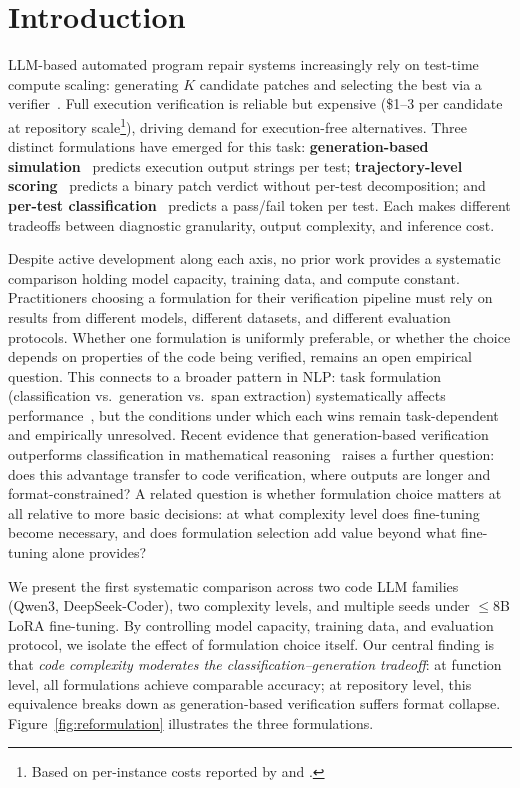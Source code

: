 \section{Introduction}
\label{sec:introduction}

LLM-based automated program repair systems increasingly rely on test-time compute scaling: generating $K$ candidate patches and selecting the best via a verifier~\cite{snell2024scaling}. Full execution verification is reliable but expensive (\$1--3 per candidate at repository scale\footnote{Based on per-instance costs reported by \citet{yang2024sweagent} and \citet{xia2024agentless}.}), driving demand for execution-free alternatives. Three distinct formulations have emerged for this task: \textbf{generation-based simulation}~\cite{meta2025cwm,maimon2026selfexecution} predicts execution output strings per test; \textbf{trajectory-level scoring}~\cite{shum2025swerm} predicts a binary patch verdict without per-test decomposition; and \textbf{per-test classification}~\cite{ni2023lever,chen2023codet} predicts a pass/fail token per test. Each makes different tradeoffs between diagnostic granularity, output complexity, and inference cost.

Despite active development along each axis, no prior work provides a systematic comparison holding model capacity, training data, and compute constant. Practitioners choosing a formulation for their verification pipeline must rely on results from different models, different datasets, and different evaluation protocols. Whether one formulation is uniformly preferable, or whether the choice depends on properties of the code being verified, remains an open empirical question. This connects to a broader pattern in NLP: task formulation (classification vs.\ generation vs.\ span extraction) systematically affects performance~\cite{raffel2020t5}, but the conditions under which each wins remain task-dependent and empirically unresolved. Recent evidence that generation-based verification outperforms classification in mathematical reasoning~\cite{hosseini2025genrm} raises a further question: does this advantage transfer to code verification, where outputs are longer and format-constrained? A related question is whether formulation choice matters at all relative to more basic decisions: at what complexity level does fine-tuning become necessary, and does formulation selection add value beyond what fine-tuning alone provides?

We present the first systematic comparison across two code LLM families (Qwen3, DeepSeek-Coder), two complexity levels, and multiple seeds under ${\leq}$8B LoRA fine-tuning. By controlling model capacity, training data, and evaluation protocol, we isolate the effect of formulation choice itself. Our central finding is that \emph{code complexity moderates the classification--generation tradeoff}: at function level, all formulations achieve comparable accuracy; at repository level, this equivalence breaks down as generation-based verification suffers format collapse. Figure~\ref{fig:reformulation} illustrates the three formulations.

